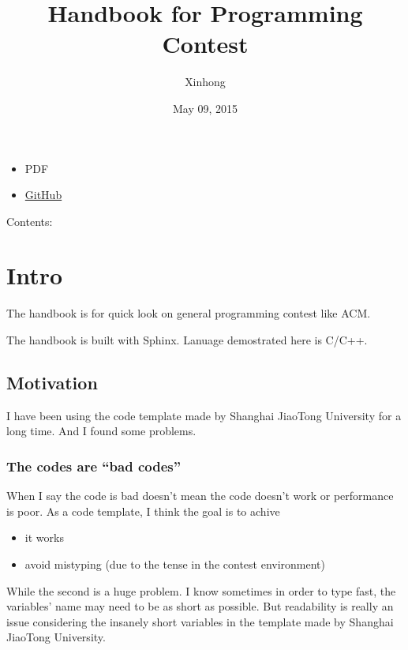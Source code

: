 \documentclass[letterpaper,10pt,english]{sphinxmanual}
\title{Handbook for Programming Contest}
\date{May 09, 2015}
\author{Xinhong}
\begin{document}
\maketitle
\tableofcontents
{}\label{index::doc}

\begin{itemize}
\item {} 
PDF

\item {} 
\href{https://github.com/Aahung/Handbook-for-Programming-Contest}{GitHub}

\end{itemize}

Contents:


\chapter{Intro}
\label{intro:intro}\label{intro::doc}\label{intro:handbook-for-programming-contest}
The handbook is for quick look on general programming contest like ACM.

The handbook is built with Sphinx. Lanuage demostrated here is C/C++.


\section{Motivation}
\label{intro:motivation}
I have been using the code template made by Shanghai JiaoTong
University for a long time. And I found some problems.


\subsection{The codes are ``bad codes''}
\label{intro:the-codes-are-bad-codes}
When I say the code is bad doesn't mean the code doesn't work or performance is poor.
As a code template, I think the goal is to achive
\begin{itemize}
\item {} 
it works

\item {} 
avoid mistyping (due to the tense in the contest environment)

\end{itemize}

While the second is a huge problem. I know sometimes in order to type fast,
the variables' name may need to be as short as possible.
But readability is really an issue considering the insanely short variables
in the template made by Shanghai JiaoTong University.
\end{document}
